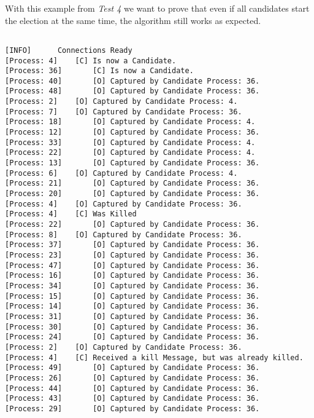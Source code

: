 	\vspace{10pt}

	With this example from \textit{Test 4} we want to prove that even if all candidates start the election at the same time, the algorithm still works as expected.

	\vspace{10pt}
	
	\begin{Verbatim}[commandchars=\\\{\},codes={\catcode`$=3\catcode`_=8},frame=single,label=Test 6 output]
	
[INFO]	  	Connections Ready
[Process: 4]	[C]	Is now a Candidate.
[Process: 36]       [C]	Is now a Candidate.
[Process: 40]       [O]	Captured by Candidate Process: 36.
[Process: 48]       [O]	Captured by Candidate Process: 36.
[Process: 2]	[O]	Captured by Candidate Process: 4.
[Process: 7]	[O]	Captured by Candidate Process: 36.
[Process: 18]       [O]	Captured by Candidate Process: 4.
[Process: 12]       [O]	Captured by Candidate Process: 36.
[Process: 33]       [O]	Captured by Candidate Process: 4.
[Process: 22]       [O]	Captured by Candidate Process: 4.
[Process: 13]       [O]	Captured by Candidate Process: 36.
[Process: 6]	[O]	Captured by Candidate Process: 4.
[Process: 21]       [O]	Captured by Candidate Process: 36.
[Process: 20]       [O]	Captured by Candidate Process: 36.
[Process: 4]	[O]	Captured by Candidate Process: 36.
[Process: 4]	[C]	Was Killed
[Process: 22]       [O]	Captured by Candidate Process: 36.
[Process: 8]	[O]	Captured by Candidate Process: 36.
[Process: 37]       [O]	Captured by Candidate Process: 36.
[Process: 23]       [O]	Captured by Candidate Process: 36.
[Process: 47]       [O]	Captured by Candidate Process: 36.
[Process: 16]       [O]	Captured by Candidate Process: 36.
[Process: 34]       [O]	Captured by Candidate Process: 36.
[Process: 15]       [O]	Captured by Candidate Process: 36.
[Process: 14]       [O]	Captured by Candidate Process: 36.
[Process: 31]       [O]	Captured by Candidate Process: 36.
[Process: 30]       [O]	Captured by Candidate Process: 36.
[Process: 24]       [O]	Captured by Candidate Process: 36.
[Process: 2]	[O]	Captured by Candidate Process: 36.
[Process: 4]	[C]	Received a kill Message, but was already killed.
[Process: 49]       [O]	Captured by Candidate Process: 36.
[Process: 26]       [O]	Captured by Candidate Process: 36.
[Process: 44]       [O]	Captured by Candidate Process: 36.
[Process: 43]       [O]	Captured by Candidate Process: 36.
[Process: 29]       [O]	Captured by Candidate Process: 36.

\end{Verbatim}
